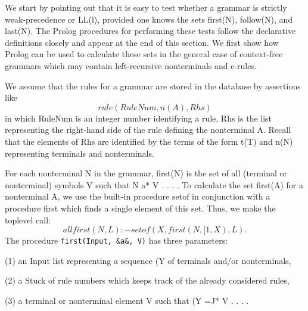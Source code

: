 We start by pointing out that it is easy to test whether a grammar is strictly
weak-precedence or LL(l), provided one knows the sets first(N), follow(N), and
last(N). The Prolog procedures for performing these tests follow the declarative
definitions closely and appear at the end of this section. We first show how
Prolog can be used to calculate these sets in the general case of context-free
grammars which may contain left-recursive nonterminals and e-rules. 

We assume that the rules for a grammar are stored in the database by assertions
like
\[rule(RuleNum, n(A), Rhs)\]
in which RuleNum is an integer number identifying a rule, Rhs is the list
representing the right-hand side of the rule defining the nonterminal A. Recall
that the elements of Rhs are identified by the terms of the form t(T) and n(N)
representing terminals and nonterminals. 

For each nonterminal N in the grammar, first(N) is the set of all (terminal or
nonterminal) symbols V such that N a* V . . . . To calculate the set first(A) for
a nonterminal A, we use the built-in procedure setof in conjunction with a
procedure first which finds a single element of this set. Thus, we make the toplevel
call:
\[allfirst(N, L) :- setof(X, first(N, [ 1, X), L).\]
The procedure \verb|first(Input, &a&, V)| has three parameters:

(1) an Input list representing a sequence (Y of terminals and/or nonterminals,

(2) a Stuck of rule numbers which keeps track of the already considered rules,

(3) a terminal or nonterminal element V such that (Y =J* V . . . .

